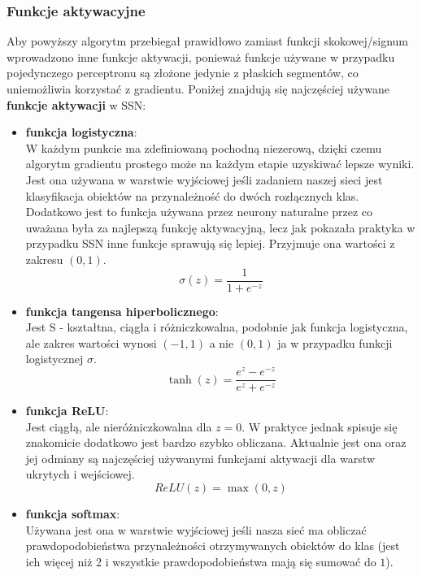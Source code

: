 \documentclass{article}
\begin{document}
\subsubsection{Funkcje aktywacyjne}
Aby powyższy algorytm przebiegał prawidłowo zamiast funkcji skokowej/signum wprowadzono inne 
funkcje aktywacji, ponieważ funkcje używane w przypadku pojedynczego perceptronu są złożone
jedynie z płaskich segmentów, co uniemożliwia korzystać z gradientu. Poniżej znajdują się 
najczęściej używane \textbf{funkcje aktywacji} w SSN:
\begin{itemize}
\item \textbf{funkcja logistyczna}:\\
W każdym punkcie ma zdefiniowaną pochodną niezerową, dzięki czemu algorytm gradientu prostego
może na każdym etapie uzyskiwać lepsze wyniki. Jest ona używana w warstwie wyjściowej jeśli
zadaniem naszej sieci jest klasyfikacja obiektów na przynależność do dwóch rozłącznych klas.
Dodatkowo jest to funkcja używana przez neurony 
naturalne przez co uważana była za najlepszą funkcję aktywacyjną, lecz jak pokazała praktyka
w przypadku SSN inne funkcje sprawują się lepiej. Przyjmuje ona wartości z zakresu $(0,1)$.
\begin{equation}
\sigma(z) = \frac{1}{1 + e^{-z}}
\end{equation}
\item \textbf{funkcja tangensa hiperbolicznego}:\\
Jest S - kształtna, ciągła i różniczkowalna, podobnie jak funkcja logistyczna, 
ale zakres wartości wynosi $(-1, 1)$ a nie $(0, 1)$ ja w przypadku funkcji logistycznej
$\sigma$.
\begin{equation}
	\tanh(z) = \frac{e^z - e^{-z}}{e^z + e^{-z}}
\end{equation}
\item \textbf{funkcja ReLU}:\\
Jest ciągłą, ale nieróżniczkowalna dla $z = 0$. W praktyce jednak spisuje się znakomicie 
dodatkowo jest bardzo szybko obliczana. Aktualnie jest ona oraz jej odmiany są najczęściej
używanymi funkcjami aktywacji dla warstw ukrytych i wejściowej. 
\begin{equation}
	ReLU(z) = \max(0, z)
\end{equation}
\item \textbf{funkcja softmax}:\\
Używana jest ona w warstwie wyjściowej jeśli nasza sieć ma obliczać
prawdopodobieństwa przynależności otrzymywanych obiektów  do klas 
(jest ich więcej niż 2 i wszystkie prawdopodobieństwa mają się sumować do $1$).

\end{itemize}
\end{document}
